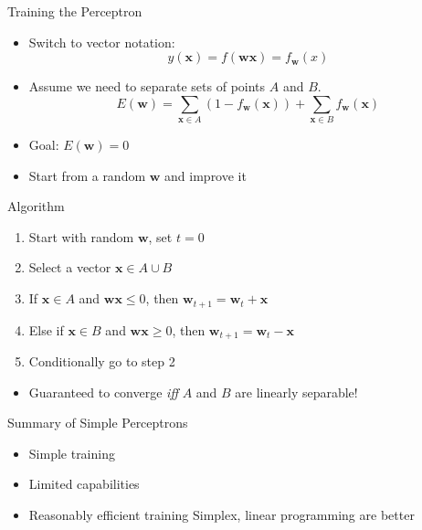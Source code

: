 \documentclass[size=14pt,
  style=tycja,
  paper=screen,
  ]{powerdot}
\begin{document}
\begin{slide}{Training the Perceptron}
  \begin{itemize}
  \item Switch to vector notation:
  \begin{equation}
    y(\mathbf x) = f(\mathbf w \mathbf x) = f_{\mathbf w}(x)
  \end{equation}
  \item Assume we need to separate sets of points $A$ and $B$.
  \begin{equation}
    E(\mathbf w) = \displaystyle\sum_{\mathbf x\in A}(1 - f_{\mathbf w}(\mathbf x)) + \displaystyle\sum_{\mathbf x\in B}f_{\mathbf w}(\mathbf x)
  \end{equation}
  \item Goal: $E(\mathbf w) = 0$
  \item Start from a random $\mathbf w$ and improve it
  \end{itemize}
\end{slide}

\begin{slide}{Algorithm}
  \begin{enumerate}
  \item Start with random $\mathbf w$, set $t = 0$
  \item Select a vector $\mathbf x \in A \cup B$
  \item If $\mathbf x \in A$ and $\mathbf w \mathbf x \leq 0$, then $\mathbf w_{t+1} = \mathbf w_t + \mathbf x$
  \item Else if $\mathbf x \in B$ and $\mathbf w \mathbf x \geq 0$, then $\mathbf w_{t+1} = \mathbf w_t - \mathbf x$    
  \item Conditionally go to step 2
  \end{enumerate}
  \begin{itemize}
   \item Guaranteed to converge \emph{iff} $A$ and $B$ are linearly separable!
  \end{itemize}
\end{slide}

\begin{slide}{Summary of Simple Perceptrons}
  \begin{itemize}
  \item Simple training
  \item Limited capabilities
  \item Reasonably efficient training
    \subitem Simplex, linear programming are better
  \end{itemize}
\end{slide}
\end{document}
